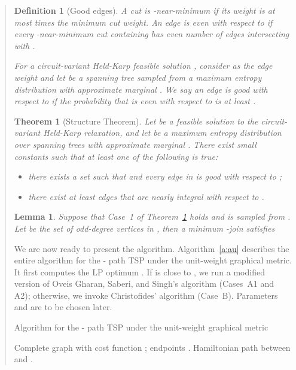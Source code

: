 \documentclass[11pt,letterpaper]{article}
\newtheorem{lemma}{Lemma}
\newtheorem{thm}{Theorem}
\newtheorem{defn}{Definition}
\newcommand{\st}{\mbox{-} }
\begin{document}
\begin{quote}
\begin{defn}[Good edges]\label{d:goodedges}
A cut is -near-minimum if its weight is at most  times the minimum cut weight. An edge  is \emph{even} with respect to  if every -near-minimum cut containing  has even number of edges intersecting with .

For a circuit-variant Held-Karp feasible solution , consider  as the edge weight and let  be a spanning tree sampled from a maximum entropy distribution with approximate marginal . We say an edge  is \emph{good} with respect to  if the probability that  is even with respect to  is at least .
\end{defn}

\begin{thm}[Structure Theorem]
\label{t:structure}
Let  be a feasible solution to the circuit-variant Held-Karp relaxation, and let  be a maximum entropy distribution over spanning trees with approximate marginal . There exist small constants  such that at least one of the following is true:\begin{itemize}
\item[1.] there exists a set  such that  and every edge in  is good with respect to ;
\item[2.] there exist at least  edges that are nearly integral with respect to .
\end{itemize}
\end{thm}

\begin{lemma}
\label{l:case1}
Suppose that Case~1 of Theorem~\ref{t:structure} holds and  is sampled from . Let  be the set of odd-degree vertices in , then a minimum -join  satisfies
\end{lemma}

We are now ready to present the algorithm. Algorithm~\ref{a:au} describes the entire algorithm for the \st path TSP under the unit-weight graphical metric. It first computes the LP optimum . If  is close to , we run a modified version of Oveis Gharan, Saberi, and Singh's algorithm (Cases~A1 and A2); otherwise, we invoke Christofides' algorithm (Case~B). Parameters  and  are to be chosen later.

\begin{algorithm}[ht]
\caption{Algorithm for the \st path TSP under the unit-weight graphical metric}
\label{a:au}
\begin{algorithmic}[1]
	\REQUIRE Complete graph  with cost function ; endpoints .
	\ENSURE Hamiltonian path between  and .


\end{algorithmic}
\end{algorithm}
\end{quote}
\end{document}
